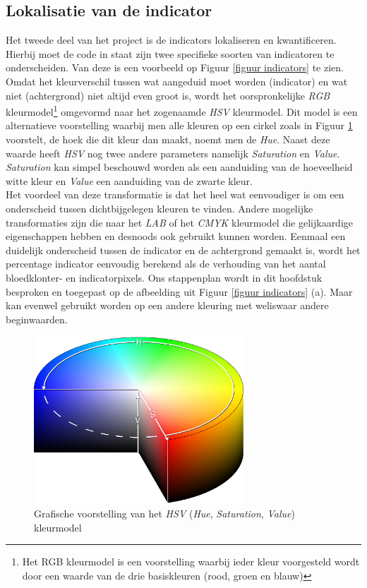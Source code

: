\documentclass[a4paper,kulak]{kulakarticle}
\begin{document}
\subsection{Lokalisatie van de indicator} \label{lokalisatie_indicator}
Het tweede deel van het project is de indicators lokaliseren en kwantificeren. Hierbij moet de code in staat zijn twee specifieke soorten van indicatoren te onderscheiden. Van deze is een voorbeeld op Figuur \ref{figuur indicators} te zien. Omdat het kleurverschil tussen wat aangeduid moet worden (indicator) en wat niet (achtergrond) niet altijd even groot is, wordt het oorspronkelijke \textit{RGB} kleurmodel\footnote{Het RGB kleurmodel is een voorstelling waarbij ieder kleur voorgesteld wordt door een waarde van de drie basiskleuren (rood, groen en blauw)} omgevormd naar het zogenaamde \textit{HSV} kleurmodel. Dit model is een alternatieve voorstelling waarbij men alle kleuren op een cirkel zoals in Figuur \ref{figuur hsv_schema} voorstelt, de hoek die dit kleur dan maakt, noemt men de \textit{Hue}. Naast deze waarde heeft \textit{HSV} nog twee andere parameters namelijk \textit{Saturation} en \textit{Value}. \textit{Saturation} kan simpel beschouwd worden als een aanduiding van de hoeveelheid witte kleur en \textit{Value} een aanduiding van de zwarte kleur.\\
Het voordeel van deze transformatie is dat het heel wat eenvoudiger is om een onderscheid tussen dichtbijgelegen kleuren te vinden. Andere mogelijke transformaties zijn die naar het \textit{LAB} of het \textit{CMYK} kleurmodel die gelijkaardige eigenschappen hebben en desnoods ook gebruikt kunnen worden. Eenmaal een duidelijk onderscheid tussen de indicator en de achtergrond gemaakt is, wordt het percentage indicator eenvoudig berekend als de verhouding van het aantal bloedklonter- en indicatorpixels. Ons stappenplan wordt in dit hoofdstuk besproken en toegepast op de afbeelding uit Figuur \ref{figuur indicators} (a). Maar kan evenwel gebruikt worden op een andere kleuring met weliswaar andere beginwaarden.

\begin{figure}[H]
	\centering
	\includegraphics[width=0.7\textwidth]{HSV_vb.png}
	
	\caption{Grafische voorstelling van het \textit{HSV} (\textit{Hue}, \textit{Saturation}, \textit{Value}) kleurmodel\cite{hsvcolspace}}
	\label{figuur hsv_schema}
\end{figure}
\end{document}
